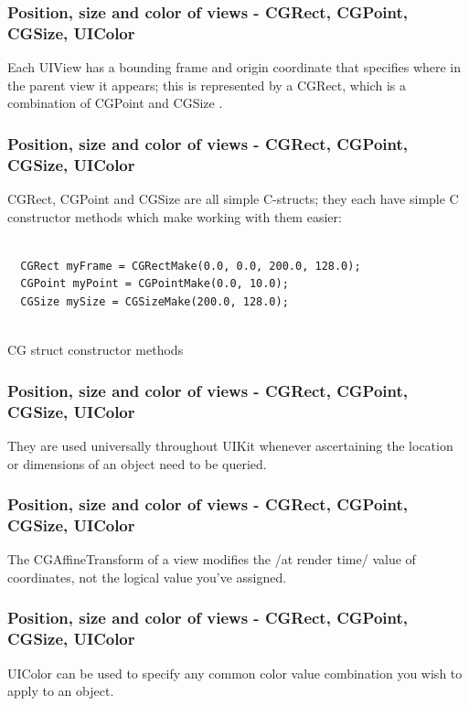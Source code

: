 \documentclass[10pt]{beamer}
\begin{document}
    
\begin{frame}[fragile]
  \frametitle{Position, size and color of views - CGRect, CGPoint, CGSize, UIColor}
  Each UIView has a bounding frame and origin coordinate that specifies where in the parent view it appears; this is represented by a CGRect, which is a combination of CGPoint and CGSize .

\end{frame}

\begin{frame}[fragile]
  \frametitle{Position, size and color of views - CGRect, CGPoint, CGSize, UIColor}
  CGRect, CGPoint and CGSize are all simple C-structs; they each have simple C constructor methods which make working with them easier: \begin{listing}[H]
    \begin{verbatim}
  
  CGRect myFrame = CGRectMake(0.0, 0.0, 200.0, 128.0);
  CGPoint myPoint = CGPointMake(0.0, 10.0);
  CGSize mySize = CGSizeMake(200.0, 128.0);
              
  \end{verbatim}
    \caption{CG struct constructor methods}
    \label{listing:31}
  \end{listing}

\end{frame}

\begin{frame}[fragile]
  \frametitle{Position, size and color of views - CGRect, CGPoint, CGSize, UIColor}
  They are used universally throughout UIKit whenever ascertaining the location or dimensions of an object need to be queried.

\end{frame}

\begin{frame}[fragile]
  \frametitle{Position, size and color of views - CGRect, CGPoint, CGSize, UIColor}
  The CGAffineTransform of a view modifies the /at render time/ value of coordinates, not the logical value you've assigned.

\end{frame}

\begin{frame}[fragile]
  \frametitle{Position, size and color of views - CGRect, CGPoint, CGSize, UIColor}
  UIColor can be used to specify any common color value combination you wish to apply to an object.

\end{frame}
\end{document}

